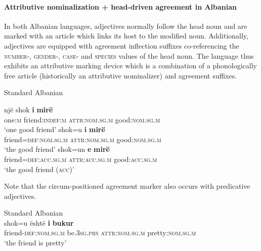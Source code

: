 \paragraph*{Attributive nominalization + head\hyp{}driven agreement in Albanian}
In both Albanian languages, adjectives normally follow the head noun and are marked with an article which links its host to the modified noun. Additionally, adjectives are equipped with agreement inflection suffixes co-referencing the \textsc{number}-, \textsc{gender}-, \textsc{case}- and \textsc{species} values of the head noun. The language thus exhibits an attributive marking device which is a combination of a phonologically free article (historically an attributive nominalizer) and agreement suffixes.
\begin{exe}
\label{albanian ex}
\ex \rm{Standard Albanian \citep[examples from][166–167]{himmelmann1997}}
\begin{xlist}
\ex
\gll	një	shok 	\textbf{i}	\textbf{mirë}\\
	one:\textsc{m}	friend:\textsc{indef:m} 	\textsc{attr:nom.sg.m}	good:\textsc{nom.sg.m}\\
\glt	‘one good friend’
\ex	
\gll	shok=u			\textbf{i}			\textbf{mirë}\\
	friend=\textsc{def:nom.sg.m} 	\textsc{attr:nom.sg.m} 	good:\textsc{nom.sg.m}\\
\glt	‘the good friend’
\ex
\gll	shok=un					\textbf{e}			\textbf{mirë}\\
	friend=\textsc{def:acc.sg.m} 	\textsc{attr:acc.sg.m} 	good:\textsc{acc.sg.m}\\
\glt	‘the good friend (\textsc{acc})’
\end{xlist}
\end{exe}
Note that the circum-positioned agreement marker also occurs with predicative adjectives. 
\begin{exe}
\ex \rm{Standard Albanian \citep{demiraj1998}}\\
\gll	shok=u është \textbf{i} \textbf{bukur}\\
	friend-\textsc{def:nom.sg.m} be\textsc{.3sg.prs} \textsc{attr:nom.sg.m} pretty:\textsc{nom.sg.m}\\
\glt	‘the friend is pretty’
\end{exe}
